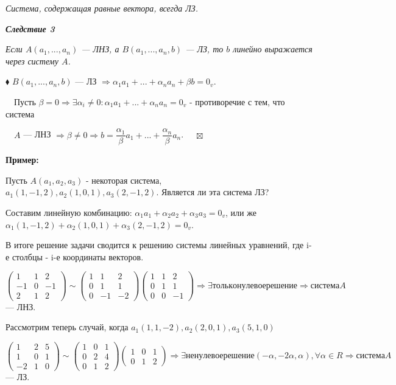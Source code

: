 \documentclass[a4paper, 12pt]{report}
\begin{document}
\begin{enumerate}
		\textit{Система, содержащая равные вектора, всегда ЛЗ.}
		
		\textbf{\textit{Следствие 3}}
		
		\textit{Если $A(a_1, ..., a_n)$ --- ЛНЗ, а $B(a_1, ..., a_n, b)$ --- ЛЗ, то $b$ линейно выражается через систему $A$.}
		
		$\blacklozenge$ $B(a_1, ..., a_n, b)$ --- ЛЗ $\Rightarrow \alpha_1a_1 + ... + \alpha_n a_n + \beta b = 0_v$.
		
		$\quad$Пусть $\beta = 0 \Rightarrow \exists \alpha_i \ne 0: \alpha_1a_1 + ... + \alpha_n a_n = 0_v$ - противоречие с тем, что система 
		
		$\quad A$ --- ЛНЗ $\Rightarrow \beta \ne 0 \Rightarrow b = \dfrac{\alpha_1}{\beta}a_1 + ... + \dfrac{\alpha_n}{\beta}a_n$. $\quad\boxtimes$ 
		\par\bigskip
		\textbf{Пример:}
		
		Пусть $A(a_1, a_2, a_3)$ - некоторая система, $a_1(1, -1, 2), a_2(1, 0, 1), a_3(2, -1, 2)$. Является ли эта система ЛЗ?
		
		Составим линейную комбинацию: $\alpha_1a_1 + \alpha_2a_2 + \alpha_3a_3 = 0_v$, или же $\alpha_1(1, -1, 2) + \alpha_2(1, 0, 1) + \alpha_3(2, -1, 2) = 0_v$.
		
		В итоге решение задачи сводится к решению системы линейных уравнений, где i-е столбцы - i-е координаты векторов.
		
		$\begin{pmatrix} 1 & 1 & 2 \\ -1 & 0 & -1 \\ 2 & 1 & 2 \end{pmatrix}\sim
		\begin{pmatrix} 1 & 1 & 2 \\ 0 & 1 & 1 \\ 0 & -1 & -2 \end{pmatrix}
		\begin{pmatrix} 1 & 1 & 2 \\  0 & 1 & 1 \\ 0 & 0 & -1 \end{pmatrix} \Rightarrow \exists только нулевое решение \Rightarrow система A$ --- ЛНЗ.
		\par\bigskip
		
		Рассмотрим теперь случай, когда $a_1(1, 1, -2), a_2(2, 0, 1), a_3(5, 1, 0)$
		
		$\begin{pmatrix} 1 & 2 & 5 \\ 1 & 0 & 1 \\ -2 & 1 & 0 \end{pmatrix}\sim
		\begin{pmatrix} 1 & 0 & 1 \\ 0 & 2 & 4 \\ 0 & 1 & 2 \end{pmatrix}
		\begin{pmatrix} 1 & 0 & 1 \\ 0 & 1 & 2 \end{pmatrix} \Rightarrow \exists ненулевое решение (-\alpha, -2\alpha, \alpha), \forall \alpha \in R \Rightarrow система A$ --- ЛЗ.
		
	\end{enumerate}
	
\end{document}
